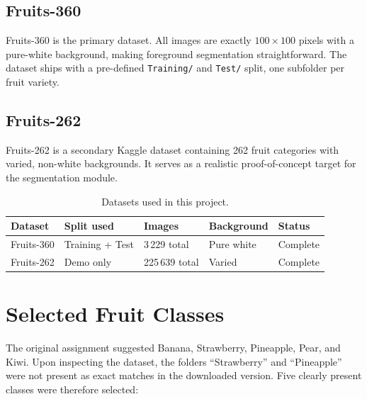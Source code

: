 \documentclass[11pt,a4paper]{article}
\begin{document}
\subsection*{Fruits-360}

Fruits-360 \citep{muresan2018fruit} is the primary dataset.  All images are
exactly $100 \times 100$ pixels with a pure-white background, making foreground
segmentation straightforward.  The dataset ships with a pre-defined
\texttt{Training/} and \texttt{Test/} split, one subfolder per fruit variety.

\subsection*{Fruits-262}

Fruits-262 \citep{fruits262kaggle} is a secondary Kaggle dataset containing
262 fruit categories with varied, non-white backgrounds.  It serves as a
realistic proof-of-concept target for the segmentation module.

\begin{table}[H]
  \centering
  \caption{Datasets used in this project.}
  \label{tab:datasets}
  \begin{tabular}{@{}lllll@{}}
    \toprule
    \textbf{Dataset} & \textbf{Split used} & \textbf{Images} &
    \textbf{Background} & \textbf{Status} \\
    \midrule
    Fruits-360 & Training + Test & 3\,229 total & Pure white & Complete \\
    Fruits-262 & Demo only & 225\,639 total & Varied & Complete \\
    \bottomrule
  \end{tabular}
\end{table}

\section{Selected Fruit Classes}

The original assignment suggested Banana, Strawberry, Pineapple, Pear, and
Kiwi.  Upon inspecting the dataset, the folders ``Strawberry'' and
``Pineapple'' were not present as exact matches in the downloaded version.
Five clearly present classes were therefore selected:
\end{document}
